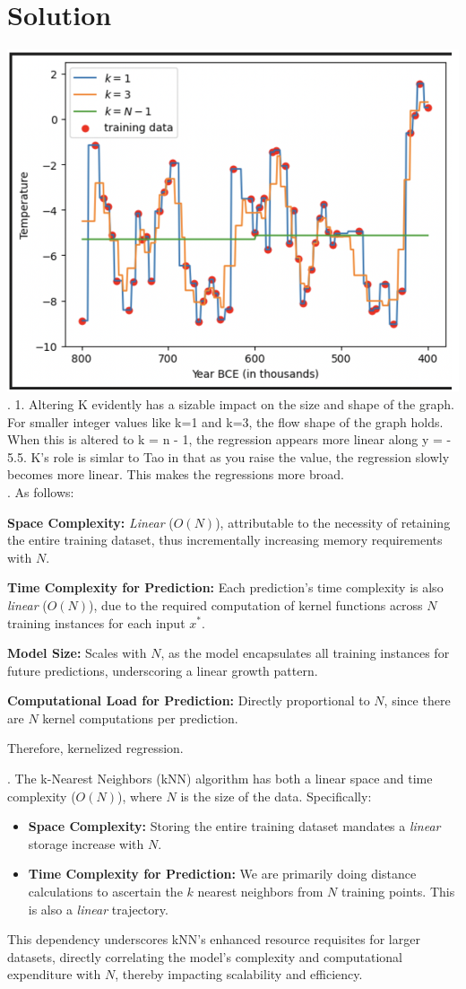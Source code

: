 \documentclass[submit]{harvardml}
\newenvironment{solution}
  {\color{blue}\section*{Solution}}
{}
\begin{document}
\begin{solution}
 \includegraphics[width=0.5\linewidth]{hw1/ss2.png}.
1. Altering K evidently has a sizable impact on the size and shape of the graph. For smaller integer values like k=1 and k=3, the flow shape of the graph holds. When this is altered to k = n - 1, the regression appears more linear along y = - 5.5. K's role is simlar to Tao in that as you raise the value, the regression slowly becomes more linear. This makes the regressions more broad. 
\\ . As follows: 

\textbf{Space Complexity:} \textit{Linear} ($O(N)$), attributable to the necessity of retaining the entire training dataset, thus incrementally increasing memory requirements with $N$.

\textbf{Time Complexity for Prediction:} Each prediction's time complexity is also \textit{linear} ($O(N)$), due to the required computation of kernel functions across $N$ training instances for each input $x^*$.

\textbf{Model Size:} Scales with $N$, as the model encapsulates all training instances for future predictions, underscoring a linear growth pattern.

\textbf{Computational Load for Prediction:} Directly proportional to $N$, since there are $N$ kernel computations per prediction. 

Therefore, kernelized regression. 

. The k-Nearest Neighbors (kNN) algorithm has both a linear space and time complexity (\(O(N)\)), where \(N\) is the size of the data. Specifically:

\begin{itemize}
    \item \textbf{Space Complexity:} Storing the entire training dataset mandates a \textit{linear} storage increase with \(N\).
    \item \textbf{Time Complexity for Prediction:} We are primarily doing distance calculations to ascertain the \(k\) nearest neighbors from \(N\) training points. This is also a \textit{linear} trajectory.
\end{itemize}

This dependency underscores kNN's enhanced resource requisites for larger datasets, directly correlating the model's complexity and computational expenditure with \(N\), thereby impacting scalability and efficiency.
\end{solution}
\end{document}
